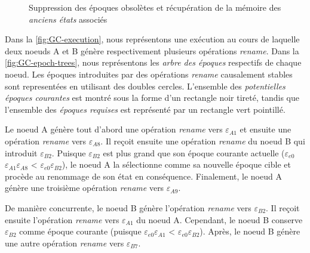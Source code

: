 \documentclass[12pt]{thesul}
\newcommand{\epoch}[1]{$\varepsilon_{#1}$}
\begin{document}
\begin{figure}[!ht]
{\begin{minipage}{\linewidth}
          \label{fig:GC-epoch-trees}
      \end{minipage}}
  \caption{Suppression des époques obsolètes et récupération de la mémoire des \emph{anciens états} associés}
  \label{fig:GC-epochs}
\end{figure}

Dans la \autoref{fig:GC-execution}, nous représentons une exécution au cours de laquelle deux noeuds A et B génère respectivement plusieurs opérations \emph{rename}.
Dans la \autoref{fig:GC-epoch-trees}, nous représentons les \emph{arbre des époques} respectifs de chaque noeud.
Les époques introduites par des opérations \emph{rename} causalement stables sont representées en utilisant des doubles cercles.
L'ensemble des \emph{potentielles époques courantes} est montré sous la forme d'un rectangle noir tireté, tandis que l'ensemble des \emph{époques requises} est représenté par un rectangle vert pointillé.

Le noeud A génère tout d'abord une opération \emph{rename} vers \epoch{A1} et ensuite une opération \emph{rename} vers \epoch{A8}.
Il reçoit ensuite une opération \emph{rename} du noeud B qui introduit \epoch{B2}.
Puisque \epoch{B2} est plus grand que son époque courante actuelle (\epoch{e0}\epoch{A1}\epoch{A8} < \epoch{e0}\epoch{B2}), le noeud A la sélectionne comme sa nouvelle époque cible et procède au renommage de son état en conséquence.
Finalement, le noeud A génère une troisième opération \emph{rename} vers \epoch{A9}.

De manière concurrente, le noeud B génère l'opération \emph{rename} vers \epoch{B2}.
Il reçoit ensuite l'opération \emph{rename} vers \epoch{A1} du noeud A.
Cependant, le noeud B conserve \epoch{B2} comme époque courante (puisque \epoch{e0}\epoch{A1} < \epoch{e0}\epoch{B2}).
Après, le noeud B génère une autre opération \emph{rename} vers \epoch{B7}.
\end{document}
